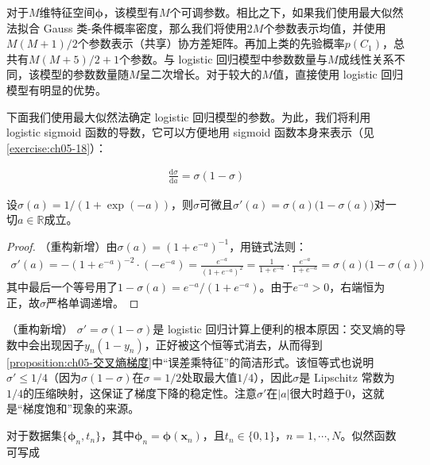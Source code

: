 \documentclass[../../main.tex]{subfiles}
\begin{document}
对于$M$维特征空间$\boldsymbol{\phi}$，该模型有$M$个可调参数。相比之下，如果我们使用最大似然法拟合 Gauss 类-条件概率密度，那么我们将使用$2M$个参数表示均值，并使用$M(M+1)/2$个参数表示（共享）协方差矩阵。再加上类的先验概率$p(C_1)$，总共有$M(M+5)/2+1$个参数。与 logistic 回归模型中参数数量与$M$成线性关系不同，该模型的参数数量随$M$呈二次增长。对于较大的$M$值，直接使用 logistic 回归模型有明显的优势。

下面我们使用最大似然法确定 logistic 回归模型的参数。为此，我们将利用 logistic sigmoid 函数的导数，它可以方便地用 sigmoid 函数本身来表示（见\cref{exercise:ch05-18}）：

\begin{align}
  \frac{\mathrm{d}\sigma}{\mathrm{d}a}=\sigma(1-\sigma)
  \label{align:ch05-sigmoid导数}
\end{align}

\begin{proposition}\label{proposition:ch05-sigmoid导数}
设$\sigma(a)=1/(1+\exp(-a))$，则$\sigma$可微且$\sigma'(a)=\sigma(a)\bigl(1-\sigma(a)\bigr)$对一切$a\in\mathbb{R}$成立。
\end{proposition}

\begin{proof}
（重构新增）由$\sigma(a)=(1+e^{-a})^{-1}$，用链式法则：
\begin{align}
  \sigma'(a)=-(1+e^{-a})^{-2}\cdot(-e^{-a})=\frac{e^{-a}}{(1+e^{-a})^{2}}=\frac{1}{1+e^{-a}}\cdot\frac{e^{-a}}{1+e^{-a}}=\sigma(a)\bigl(1-\sigma(a)\bigr)
\end{align}
其中最后一个等号用了$1-\sigma(a)=e^{-a}/(1+e^{-a})$。由于$e^{-a}>0$，右端恒为正，故$\sigma$严格单调递增。
\end{proof}

\begin{remark}（重构新增）
$\sigma'=\sigma(1-\sigma)$是 logistic 回归计算上便利的根本原因：交叉熵的导数中会出现因子$y_n(1-y_n)$，正好被这个恒等式消去，从而得到\cref{proposition:ch05-交叉熵梯度}中“误差乘特征”的简洁形式。该恒等式也说明$\sigma'\leqslant 1/4$（因为$\sigma(1-\sigma)$在$\sigma=1/2$处取最大值$1/4$），因此$\sigma$是 Lipschitz 常数为$1/4$的压缩映射，这保证了梯度下降的稳定性。注意$\sigma'$在$|a|$很大时趋于0，这就是“梯度饱和”现象的来源。
\end{remark}

对于数据集$\{\boldsymbol{\phi}_n,t_n\}$，其中$\boldsymbol{\phi}_n=\boldsymbol{\phi}(\boldsymbol{x}_n)$，且$t_n\in\{0,1\}$，$n=1,\cdots,N$。似然函数可写成
\end{document}
